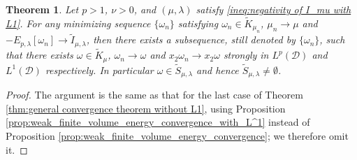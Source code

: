 \documentclass[11pt,letterpaper]{amsart}
\newtheorem{thm}{Theorem}[section]
\theoremstyle{definition}
\theoremstyle{remark}
\numberwithin{equation}{section}
\begin{document}
\begin{thm}\label{thm:general convergence for D with L1}
    Let $p>1$, $\nu>0$, and $(\mu,\lambda)$ satisfy \eqref{ineq:negativity of I_mu with L1}. For any minimizing sequence $\{\omega_n\}$ satisfying $\omega_n\in \widetilde{K}_{\mu_n}$, $\mu_n \rightarrow \mu $ and $-E_{p,\lambda}[\omega_n] \rightarrow \widetilde{I}_{\mu,\lambda}$, then there exists a subsequence, still denoted by $\{\omega_n\}$, such that there exists $\omega\in \widetilde{K}_{\mu}$, 
    $\omega_n\rightarrow\omega$ and $x_2\omega_n\rightarrow x_2\omega$ strongly in $L^p(\mathcal{D})$ and $L^1(\mathcal{D})$ respectively. In particular $\omega\in \widetilde{S}_{\mu,\lambda}$ and hence $\widetilde{S}_{\mu,\lambda}\neq \emptyset$.
\end{thm}
\begin{proof}
    The argument is the same as that for the last case of Theorem \ref{thm:general convergence theorem without L1}, using Proposition \ref{prop:weak_finite_volume_energy_convergence_with_L^1} instead of Proposition \ref{prop:weak_finite_volume_energy_convergence}; we therefore omit it. 

\end{proof}



\end{document}
